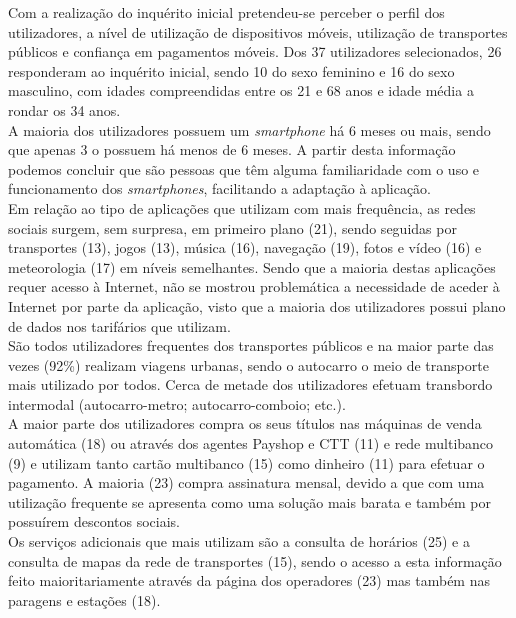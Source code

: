Com a realização do inquérito inicial pretendeu-se perceber o perfil dos utilizadores, a nível de utilização de dispositivos móveis, utilização de transportes públicos e confiança em pagamentos móveis. Dos 37 utilizadores selecionados, 26 responderam ao inquérito inicial, sendo 10 do sexo feminino e 16 do sexo masculino, com idades compreendidas entre os 21 e 68 anos e idade média a rondar os 34 anos.
\\A maioria dos utilizadores possuem um \emph{smartphone} há 6 meses ou mais, sendo que apenas 3 o possuem há menos de 6 meses. A partir desta informação podemos concluir que são pessoas que têm alguma familiaridade com o uso e funcionamento dos \emph{smartphones}, facilitando a adaptação à aplicação.
\\Em relação ao tipo de aplicações que utilizam com mais frequência, as redes sociais surgem, sem surpresa, em primeiro plano (21), sendo seguidas por transportes (13), jogos (13), música (16), navegação (19), fotos e vídeo (16) e meteorologia (17) em níveis semelhantes. Sendo que a maioria destas aplicações requer acesso à Internet, não se mostrou problemática a necessidade de aceder à Internet por parte da aplicação, visto que a maioria dos utilizadores possui plano de dados nos tarifários que utilizam.
\\São todos utilizadores frequentes dos transportes públicos e na maior parte das vezes (92\%) realizam viagens urbanas, sendo o autocarro o meio de transporte mais utilizado por todos. Cerca de metade dos utilizadores efetuam transbordo intermodal (autocarro-metro; autocarro-comboio; etc.).
\\A maior parte dos utilizadores compra os seus títulos nas máquinas de venda automática (18) ou através dos agentes Payshop e CTT (11) e rede multibanco (9) e utilizam tanto cartão multibanco (15) como dinheiro (11) para efetuar o pagamento. A maioria (23) compra assinatura mensal, devido a que com uma utilização frequente se apresenta como uma solução mais barata e também por possuírem descontos sociais.
\\Os serviços adicionais que mais utilizam são a consulta de horários (25) e a consulta de mapas da rede de transportes (15), sendo o acesso a esta informação feito maioritariamente através da página \web dos operadores (23) mas também nas paragens e estações (18).

